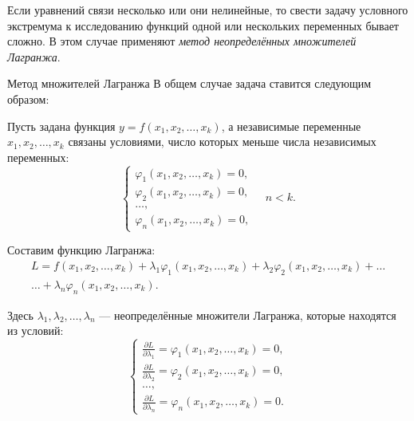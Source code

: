 Если уравнений связи несколько или они нелинейные, то свести задачу условного экстремума к исследованию функций одной или нескольких переменных бывает сложно. В этом случае применяют \textit{метод неопределённых множителей Лагранжа}.

\begin{tbox}{Метод множителей Лагранжа}
	В общем случае задача ставится следующим образом:

	Пусть задана функция $y = f(x_1, x_2, \dots, x_k)$, а независимые переменные $x_1, x_2, \dots, x_k$ связаны условиями, число которых меньше числа независимых переменных:
	\begin{equation} \label{eq:8.1}
		\begin{cases}
			\varphi_1(x_1, x_2, \dots, x_k) = 0, \\
			\varphi_2(x_1, x_2, \dots, x_k) = 0, \\
			\dots, \\
			\varphi_n(x_1, x_2, \dots, x_k) = 0,
		\end{cases}
		\quad n < k.
	\end{equation}

	Составим функцию Лагранжа:
	\begin{multline} \label{eq:8.2}
		L = f(x_1, x_2, \dots, x_k) + \lambda_1 \varphi_1(x_1, x_2, \dots, x_k) + \lambda_2 \varphi_2(x_1, x_2, \dots, x_k) + \dots \\ \dots + \lambda_n \varphi_n(x_1, x_2, \dots, x_k).
	\end{multline}

	Здесь $\lambda_1, \lambda_2, \dots, \lambda_n$ — неопределённые множители Лагранжа, которые находятся из условий:
	\begin{equation*}
		\begin{cases}
			\frac{\partial L}{\partial \lambda_1} = \varphi_1(x_1, x_2, \dots, x_k) = 0, \\
			\frac{\partial L}{\partial \lambda_2} = \varphi_2(x_1, x_2, \dots, x_k) = 0, \\
			\dots, \\
			\frac{\partial L}{\partial \lambda_n} = \varphi_n(x_1, x_2, \dots, x_k) = 0.
		\end{cases}
	\end{equation*}


\end{tbox}
